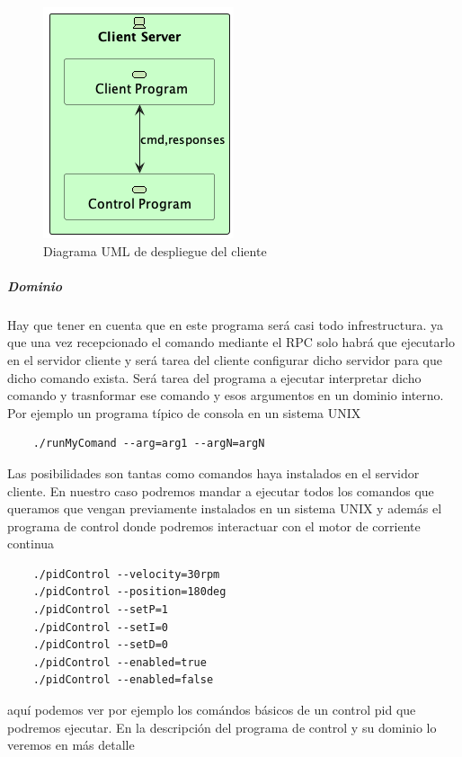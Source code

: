 \begin{figure}[H]
    \centering
    \includegraphics[height=0.2\textheight]{./part/Proyecto_ejecutivo/memoria_descriptiva/descripcionDelProyecto/client/uml/clientServerConcept}
    \caption{Diagrama UML de despliegue del cliente}\label{fig:Diagrama UML de despliegue del cliente}
\end{figure}

\subparagraph{Dominio}

Hay que tener en cuenta que en este programa será casi todo infrestructura. ya que una vez recepcionado el comando mediante el RPC
solo habrá que ejecutarlo en el servidor cliente y será tarea del cliente configurar dicho servidor para que dicho comando exista. Será tarea del programa a ejecutar interpretar dicho comando y trasnformar ese comando y esos argumentos en un dominio interno. Por ejemplo un programa típico de consola en un sistema UNIX

\begin{verbatim}
    ./runMyComand --arg=arg1 --argN=argN
\end{verbatim}


Las posibilidades son tantas como comandos haya instalados en el servidor cliente. En nuestro caso podremos mandar a ejecutar todos los comandos que queramos que vengan previamente instalados en un sistema UNIX y además el programa de control donde podremos interactuar con el motor de corriente continua

\begin{verbatim}
    ./pidControl --velocity=30rpm
    ./pidControl --position=180deg
    ./pidControl --setP=1
    ./pidControl --setI=0
    ./pidControl --setD=0
    ./pidControl --enabled=true
    ./pidControl --enabled=false
\end{verbatim}

aquí podemos ver por ejemplo los comándos básicos de un control pid que podremos ejecutar. En la descripción del programa de control y su dominio lo veremos en más detalle


